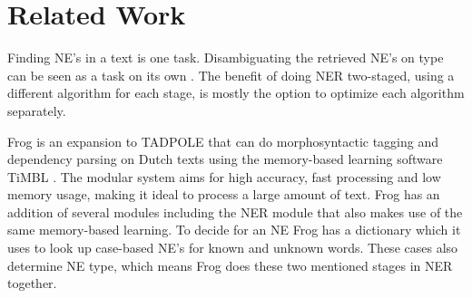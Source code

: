 \section{Related Work}
\label{sec:rel}
Finding NE's in a text is one task. Disambiguating the retrieved NE's on type can be seen as a task on its own \cite{buitinck2012two}. The benefit of doing NER two-staged, using a different algorithm for each stage, is mostly the option to optimize each algorithm separately. 

Frog is an expansion to TADPOLE \cite{bosch2007efficient} that can do morphosyntactic tagging and dependency parsing on Dutch texts using the memory-based learning software TiMBL \cite{daelemans2004timbl}. The modular system aims for high accuracy, fast processing and low memory usage, making it ideal to process a large amount of text. Frog has an addition of several modules including the NER module that also makes use of the same memory-based learning. To decide for an NE Frog has a dictionary which it uses to look up case-based NE's for known and unknown words. These cases also determine NE type, which means Frog does these two mentioned stages in NER together.



